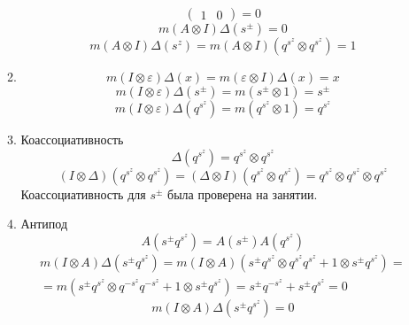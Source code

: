 \documentclass[12pt]{article}
\theoremstyle{definition}
\begin{document}
\begin{enumerate}
\begin{enumerate}
\begin{equation*}
\begin{pmatrix}
                    1 & 0
                \end{pmatrix}=0
        \end{equation*}
        \begin{equation}
            \boxed{m(A\otimes I)\Delta(s^\pm)=0}
        \end{equation}
        \begin{equation}
            \boxed{m(A\otimes I)\Delta(s^z)=m(A\otimes I)(q^{s^z}\otimes q^{s^z})=1}
        \end{equation}
        \item
        \begin{equation}
            m(I\otimes\varepsilon)\Delta(x)=m(\varepsilon\otimes I)\Delta(x)=x
        \end{equation}
        \begin{equation}
            \boxed{m(I\otimes\varepsilon)\Delta(s^\pm)=m(s^\pm\otimes1)=s^\pm}
        \end{equation}
        \begin{equation}
            \boxed{m(I\otimes\varepsilon)\Delta(q^{s^z})=m(q^{s^z}\otimes1)=q^{s^z}}
        \end{equation}
        \item Коассоциативность
        \begin{equation}
            \Delta(q^{s^z})=q^{s^z}\otimes q^{s^z}
        \end{equation}
        \begin{equation}
            \boxed{(I\otimes\Delta)(q^{s^z}\otimes q^{s^z})=(\Delta\otimes I)(q^{s^z}\otimes q^{s^z})=q^{s^z}\otimes q^{s^z}\otimes q^{s^z}}
        \end{equation}
        Коассоциативность для $s^\pm$ была проверена на занятии.
        \item Антипод
        \begin{equation}
            A(s^\pm q^{s^z})=A(s^\pm)A(q^{s^z})
        \end{equation}
        \begin{multline}
            m(I\otimes A)\Delta(s^\pm q^{s^z})=m(I\otimes A)(s^\pm q^{s^z}\otimes q^{s^z}q^{s^z}+1\otimes s^\pm q^{s^z})=\\=m(s^\pm q^{s^z}\otimes q^{-s^z}q^{-s^z}+1\otimes s^\pm q^{s^z})=s^\pm q^{-s^z}+s^\pm q^{s^z}=0
        \end{multline}
        \begin{equation}
            \boxed{m(I\otimes A)\Delta(s^\pm q^{s^z})=0}
        \end{equation}

\end{enumerate}
\end{enumerate}
\end{document}
